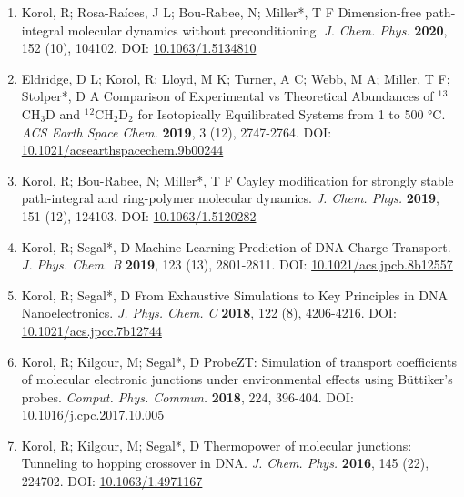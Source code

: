 \begin{enumerate}
\vspace{0.1cm}
\item[9.] Korol, R; Rosa-Raíces, J L; Bou-Rabee, N; Miller*, T F Dimension-free path-integral molecular dynamics without preconditioning. \textit{J. Chem. Phys.} \textbf{2020}, 152 (10), 104102. DOI: \href{https://doi.org/10.1063/1.5134810}{10.1063/1.5134810}
\vspace{0.1cm}
\item[8.] Eldridge, D L; Korol, R; Lloyd, M K; Turner, A C; Webb, M A; Miller, T F; Stolper*, D A Comparison of Experimental vs Theoretical Abundances of $^{1}$$^{3}$CH$_{3}$D and $^{1}$$^{2}$CH$_{2}$D$_{2}$ for Isotopically Equilibrated Systems from 1 to 500 °C. \textit{ACS Earth Space Chem.} \textbf{2019}, 3 (12), 2747-2764. DOI: \href{https://doi.org/10.1021/acsearthspacechem.9b00244}{10.1021/acsearthspacechem.9b00244}
\vspace{0.1cm}
\item[7.] Korol, R; Bou-Rabee, N; Miller*, T F Cayley modification for strongly stable path-integral and ring-polymer molecular dynamics. \textit{J. Chem. Phys.} \textbf{2019}, 151 (12), 124103. DOI: \href{https://doi.org/10.1063/1.5120282}{10.1063/1.5120282}
\vspace{0.1cm}
\item[6.] Korol, R; Segal*, D Machine Learning Prediction of DNA Charge Transport. \textit{J. Phys. Chem. B} \textbf{2019}, 123 (13), 2801-2811. DOI: \href{https://doi.org/10.1021/acs.jpcb.8b12557}{10.1021/acs.jpcb.8b12557}
\vspace{0.1cm}
\item[5.] Korol, R; Segal*, D From Exhaustive Simulations to Key Principles in DNA Nanoelectronics. \textit{J. Phys. Chem. C} \textbf{2018}, 122 (8), 4206-4216. DOI: \href{https://doi.org/10.1021/acs.jpcc.7b12744}{10.1021/acs.jpcc.7b12744}
\vspace{0.1cm}
\item[4.] Korol, R; Kilgour, M; Segal*, D ProbeZT: Simulation of transport coefficients of molecular electronic junctions under environmental effects using Büttiker's probes. \textit{Comput. Phys. Commun.} \textbf{2018}, 224, 396-404. DOI: \href{https://doi.org/10.1016/j.cpc.2017.10.005}{10.1016/j.cpc.2017.10.005}
\vspace{0.1cm}
\item[3.] Korol, R; Kilgour, M; Segal*, D Thermopower of molecular junctions: Tunneling to hopping crossover in DNA. \textit{J. Chem. Phys.} \textbf{2016}, 145 (22), 224702. DOI: \href{https://doi.org/10.1063/1.4971167}{10.1063/1.4971167}

\end{enumerate}
